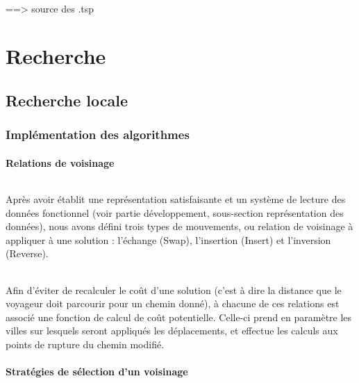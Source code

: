 \documentclass[a4paper,10pt]{report}
\begin{document}
\paragraph{} %
==> source des .tsp

\part{Recherche}
\chapter{Recherche locale}
\section{Implémentation des algorithmes}
\subsection{Relations de voisinage}

\paragraph{}
  Après avoir établit une représentation satisfaisante et un système de lecture des données fonctionnel (voir partie
développement, sous-section représentation des données), nous avons défini trois types de mouvements, ou relation de
voisinage à appliquer à une solution : l'échange (Swap), l'insertion (Insert) et l'inversion (Reverse).

\paragraph{}
Afin d'éviter de recalculer le coût d'une solution (c'est à dire la distance que le voyageur doit parcourir
pour un chemin donné), à chacune de ces relations est associé une fonction de calcul de coût potentielle.
Celle-ci prend en paramètre les villes sur lesquels seront appliqués les déplacements, et effectue les calculs
aux points de rupture du chemin modifié.


\subsection{Stratégies de sélection d'un voisinage}
\end{document}
